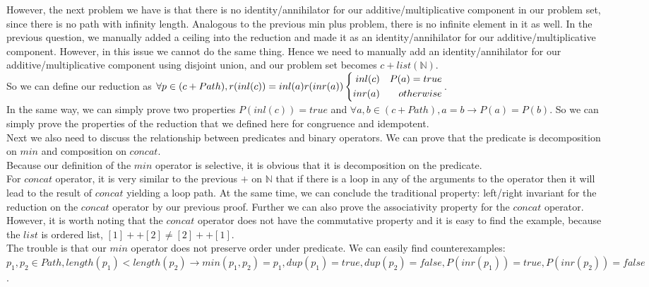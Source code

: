 \documentclass[a4paper,10pt]{article}
\begin{document}
However, the next problem we have is that there is no identity/annihilator for our additive/multiplicative component in our problem set, since there is no path with infinity length.
Analogous to the previous min plus problem, there is no infinite element in it as well. In the previous question, we manually added a ceiling into the reduction and made it as an identity/annihilator for our additive/multiplicative component. However, in this issue we cannot do the same thing. 
Hence we need to manually add an identity/annihilator for our additive/multiplicative component using disjoint union, and our problem set becomes $c + list(\mathbb{N})$.\\
So we can define our reduction as $\forall p \in (c + Path), r(inl(c)) = inl(a)\\
r(inr (a))
\left\{
\begin{aligned}
inl(c) &  & P(a) = true \\
inr(a) &  & otherwise 
\end{aligned}
\right.$.\\
In the same way, we can simply prove two properties $P(inl( c)) = true$ and $\forall a,b \in (c + Path), a = b \rightarrow P(a) = P(b)$. So we can simply prove the properties of the reduction that we defined here for congruence and idempotent.\\
Next we also need to discuss the relationship between predicates and binary operators. 
We can prove that the predicate is decomposition on $min$ and composition on $concat$. \\
Because our definition of the $min$ operator is selective, it is obvious that it is decomposition on the predicate. \\
For $concat$ operator, it is very similar to the previous $+$ on $\mathbb{N}$ that if there is a loop in any of the arguments to the operator then it will lead to the result of $concat$ yielding a loop path. At the same time, we can conclude the traditional property: left/right invariant for the reduction on the $concat$ operator by our previous proof. 
Further we can also prove the associativity property for the $concat$ operator. 
However, it is worth noting that the $concat$ operator does not have the commutative property and it is easy to find the example, because the $list$ is ordered list, $[1] ++ [2] \neq [2] ++ [1]$.\\
The trouble is that our $min$ operator does not preserve order under predicate. 
We can easily find counterexamples: $p_1,p_2 \in Path, length (p_1) < length(p_2) \rightarrow min(p_1,p_2) = p_1, dup(p_1) = true, dup(p_2) = false, P(inr(p_1)) = true, P(inr(p_2)) = false$. 
\end{document}
